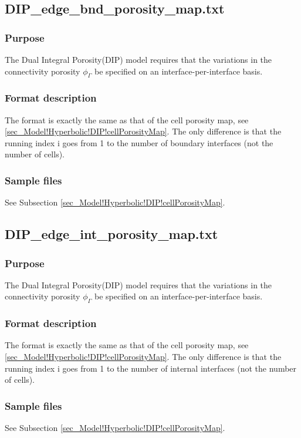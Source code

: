 \subsection{DIP\_edge\_bnd\_porosity\_map.txt}\label{sec_Model!Hyperbolic!DIP!edgePorosityMap}
%
\subsubsection{Purpose}
The Dual Integral Porosity(DIP) model requires that the variations in the connectivity porosity $\phi_\Gamma$ be specified on an interface-per-interface basis.
%
\subsubsection{Format description}
The format is exactly the same as that of the cell porosity map, see \ref{sec_Model!Hyperbolic!DIP!cellPorosityMap}. The only difference is that the running index i goes from 1 to the number of boundary interfaces (not the number of cells).
\subsubsection{Sample files}
See Subsection \ref{sec_Model!Hyperbolic!DIP!cellPorosityMap}.
\subsection{DIP\_edge\_int\_porosity\_map.txt}\label{sec_Model!Hyperbolic!DIP!edgePorosityMap}
%
\subsubsection{Purpose}
The Dual Integral Porosity(DIP) model requires that the variations in the connectivity porosity $\phi_\Gamma$ be specified on an interface-per-interface basis.
%
\subsubsection{Format description}
The format is exactly the same as that of the cell porosity map, see \ref{sec_Model!Hyperbolic!DIP!cellPorosityMap}. The only difference is that the running index i goes from 1 to the number of internal interfaces (not the number of cells).
\subsubsection{Sample files}
See Subsection \ref{sec_Model!Hyperbolic!DIP!cellPorosityMap}.